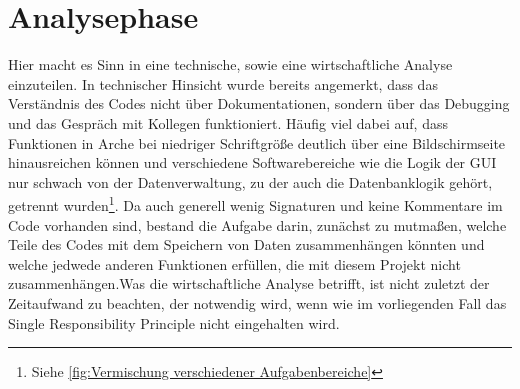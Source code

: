 \documentclass[11pt,toc=sectionentrywithoutdots, 
headheight=44pt, headings=optiontoheadandtoc, hyperfootnotes=false, hypertexnames=false]{scrartcl}
\newcommand\extendedref[1]{Siehe \ref{#1}}
\begin{document}
\section{Analysephase}
Hier macht es Sinn in eine technische, sowie eine wirtschaftliche Analyse einzuteilen. In technischer Hinsicht wurde bereits angemerkt, dass das Verständnis des Codes nicht über Dokumentationen, sondern über das Debugging und das Gespräch mit Kollegen funktioniert. Häufig viel dabei auf, dass Funktionen in Arche bei niedriger Schriftgröße deutlich über eine Bildschirmseite hinausreichen können und verschiedene Softwarebereiche wie die Logik der GUI nur schwach von der Datenverwaltung, zu der auch die Datenbanklogik gehört, getrennt wurden\footnote{\extendedref{fig:Vermischung verschiedener Aufgabenbereiche}}. Da auch generell wenig Signaturen und keine Kommentare im Code vorhanden sind, bestand die Aufgabe darin, zunächst zu mutmaßen, welche Teile des Codes mit dem Speichern von Daten zusammenhängen könnten und welche jedwede anderen Funktionen erfüllen, die mit diesem Projekt nicht zusammenhängen.\newline Was die wirtschaftliche Analyse betrifft, ist nicht zuletzt der Zeitaufwand zu beachten, der notwendig wird, wenn wie im vorliegenden Fall das \gls{Single Responsibility Principle} nicht eingehalten wird.
\end{document}
